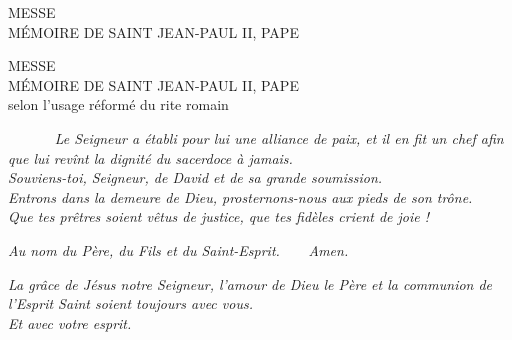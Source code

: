 \documentclass[twoside]{article}
\begin{document}
\null\vfill

\begin{center}\begin{doublespace}
{
\MakeUppercase{\Large Messe\\Mémoire de saint Jean-Paul II, pape}
}
\end{doublespace}\end{center}

\vfill\newpage

\sloppy

\begin{center}\begin{doublespace}
{
\MakeUppercase{\Large Messe\\Mémoire de saint Jean-Paul II, pape}\\
selon l'usage réformé du rite romain
}
\end{doublespace}\end{center}


~~~~~~
\emph{\rr Le Seigneur a établi pour lui une alliance de paix, et il en fit un chef afin que lui revînt la dignité du sacerdoce à jamais.\\
\vv {} Souviens-toi, Seigneur, de David et de sa grande soumission.\\
\vv {} Entrons dans la demeure de Dieu, prosternons-nous aux pieds de son trône.\\
\vv {} Que tes prêtres soient vêtus de justice, que tes fidèles crient de joie !}

\vspace{3cm}


\emph{\vv Au nom du Père, du Fils et du Saint-Esprit.~~~~\rr Amen.}


\emph{\vv La grâce de Jésus notre Seigneur, l'amour de Dieu le Père et la communion de l'Esprit Saint soient toujours avec vous. \\
\rr Et avec votre esprit.}
\end{document}
